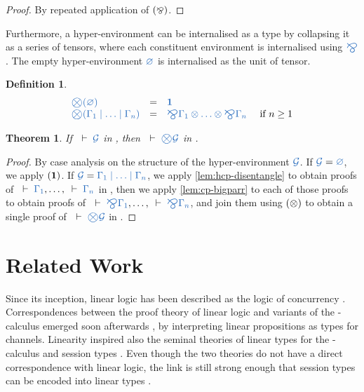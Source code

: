 \documentclass[submission,copyright,creativecommons]{eptcs}
\newtheorem{theorem}[lemma]{Theorem}
\newtheorem{definition}[lemma]{Definition}
\begin{document}
\begin{proof}
  By repeated application of $(\mathbin{\bindnasrepma})$.
\end{proof}\noindent
Furthermore, a hyper-environment can be internalised as a type by collapsing it as a series of tensors, where each constituent environment is internalised using $\ty{\bigparr}$. The empty hyper-environment $\ty{\emptyhypercontext}$ is internalised as the unit of tensor.
\begin{definition}\label{def:bigtens}
  \[
  \begin{array}{lcll}
    \ty{\bigtens(\emptyhypercontext)}
    & = & \ty{\one}
    \\
    \ty{\bigtens(\Gamma_1 \hsep \dots \hsep \Gamma_n)}
    & = & \ty{\bigparr\Gamma_1 \tens \dots \tens \bigparr\Gamma_n}
    & \text{ if } n \geq 1
  \end{array}
  \]
\end{definition}\noindent

\begin{theorem}\label{thm:hcp2cp-bigtens}
  If $\seq{\mathcal{G}}$ in \hcp, then $\seq{\bigtens\mathcal{G}}$ in \cp.
\end{theorem} 
\begin{proof}
  By case analysis on the structure of the hyper-environment $\ty{\mathcal{G}}$.
  If $\ty{\mathcal{G}} = \ty{\emptyhypercontext}$, we apply $(\mathbf{1})$.
  If $\ty{\mathcal{G}} = \ty{\Gamma_1 \hsep \dots \hsep \Gamma_n}$, we apply \cref{lem:hcp-disentangle} to obtain proofs of $\seq{\Gamma_1}, \dots, \seq{\Gamma_n}$ in \cp, then we apply \cref{lem:cp-bigparr} to each of those proofs to obtain proofs of $\seq{\bigparr\Gamma_1}, \dots, \seq{\bigparr\Gamma_n}$, and join them using $(\otimes)$ to obtain a single proof of $\seq{\bigtens\mathcal{G}}$ in \cp.
\end{proof}\noindent

\section{Related Work}
\label{sec:related-work}

Since its inception, linear logic has been described as the logic of concurrency \citep{girard1987}. Correspondences between the proof theory of linear logic and variants of the \textpi-calculus emerged soon afterwards \citep{abramsky1994,bellin1994}, by interpreting linear propositions as types for channels. Linearity inspired also the seminal theories of linear types for the \textpi-calculus \citep{kobayashi1999} and session types \citep{honda1998}. Even though the two theories do not have a direct correspondence with linear logic, the link is still strong enough that session types can be encoded into linear types \citep{dardha2017}.
\end{document}
